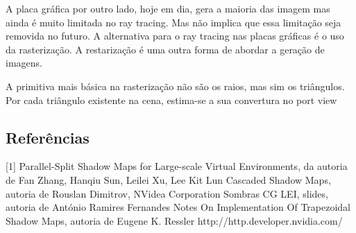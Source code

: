 \documentclass[12pt]{article}
\begin{document}
A placa gráfica por outro lado, hoje em dia, gera a maioria das imagem mas ainda é muito limitada no ray tracing. Mas não implica que essa limitação seja removida no futuro. A alternativa para o ray tracing nas placas gráficas é o uso da rasterização. A restarização é uma outra forma de abordar a geração de imagens.

A primitiva mais básica na rasterização não são os raios, mas sim os triângulos. Por cada triângulo existente na cena, estima-se a sua convertura no port view




\subsection{Referências}

[1] Parallel-Split Shadow Maps for Large-scale Virtual Environments, da autoria de Fan Zhang, Hanqiu Sun, Leilei Xu, Lee Kit Lun \newline
[2] Cascaded Shadow Maps, autoria de Rouslan Dimitrov, NVidea Corporation \newline
[3] Sombras CG LEI, slides, autoria de António Ramires Fernandes \newline
[4] Notes On Implementation Of Trapezoidal Shadow Maps, autoria de Eugene K. Ressler \newline
[5] http://http.developer.nvidia.com/ \newline
\end{document}
